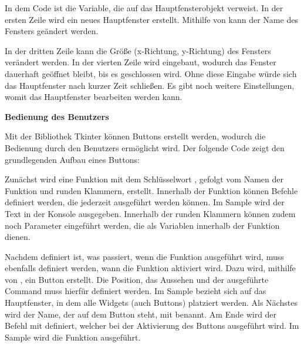 {\bigskip





\bigskip


In dem Code ist  die Variable, die auf das Hauptfensterobjekt verweist. In der ersten Zeile wird ein neues Hauptfenster erstellt. Mithilfe von  kann der Name des Fensters geändert werden.
    
In der dritten Zeile kann die Größe (x-Richtung, y-Richtung) des Fensters verändert werden. In der vierten Zeile wird  eingebaut, wodurch das Fenster dauerhaft geöffnet bleibt, bis es geschlossen wird. Ohne diese Eingabe würde sich das Hauptfenster nach kurzer Zeit schließen. Es gibt noch weitere Einstellungen, womit das Hauptfenster bearbeiten werden kann.

\bigskip

\textbf{Bedienung des Benutzers}

Mit der Bibliothek Tkinter können Buttons erstellt werden, wodurch die Bedienung durch den Benutzers ermöglicht wird. Der folgende Code zeigt den grundlegenden Aufbau eines Buttons:

\bigskip





\bigskip

Zunächst wird eine Funktion mit dem Schlüsselwort , gefolgt vom Namen der Funktion und runden Klammern, erstellt. Innerhalb der Funktion können Befehle definiert werden, die jederzeit ausgeführt werden können. Im Sample wird der Text  in der Konsole ausgegeben. Innerhalb der runden Klammern können zudem noch Parameter eingeführt werden, die als Variablen innerhalb der Funktion dienen.  

Nachdem definiert ist, was passiert, wenn die Funktion ausgeführt wird, muss ebenfalls definiert werden, wann die Funktion aktiviert wird.
Dazu wird, mithilfe von , ein Button erstellt. Die Position, das Aussehen und der ausgeführte Command muss hierfür definiert werden. Im Sample bezieht sich  auf das Hauptfenster, in dem alle Widgets (auch Buttons) platziert werden. Als Nächstes wird der Name, der auf dem Button steht, mit  benannt. Am Ende wird der Befehl mit  definiert, welcher bei der Aktivierung des Buttons ausgeführt wird. Im Sample wird die Funktion  ausgeführt.




}
